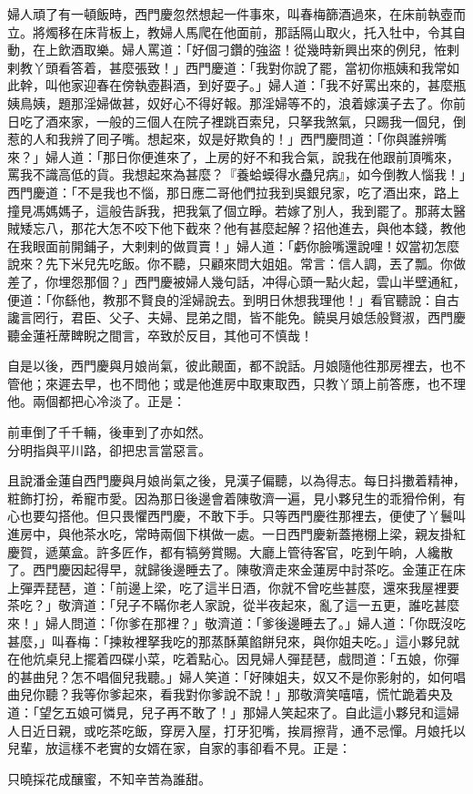 婦人頑了有一頓飯時，西門慶忽然想起一件事來，叫春梅篩酒過來，在床前執壺而立。將燭移在床背板上，教婦人馬爬在他面前，那話隔山取火，托入牡中，令其自動，在上飲酒取樂。婦人罵道：「好個刁鑽的強盜！從幾時新興出來的例兒，恠剌剌教丫頭看答着，甚麼張致！」西門慶道：「我對你說了罷，當初你瓶姨和我常如此幹，叫他家迎春在傍執壺斟酒，到好耍子。」婦人道：「我不好罵出來的，甚麼瓶姨鳥姨，題那淫婦做甚，奴好心不得好報。那淫婦等不的，浪着嫁漢子去了。你前日吃了酒來家，一般的三個人在院子裡跳百索兒，只拏我煞氣，只踢我一個兒，倒惹的人和我辨了囘子嘴。想起來，奴是好欺負的！」西門慶問道：「你與誰辨嘴來？」婦人道：「那日你便進來了，上房的好不和我合氣，說我在他跟前頂嘴來，罵我不識高低的貨。我想起來為甚麼？『養蛤蟆得水蠱兒病』，如今倒教人惱我！」西門慶道：「不是我也不惱，那日應二哥他們拉我到吳銀兒家，吃了酒出來，路上撞見馮媽媽子，這般告訴我，把我氣了個立睜。若嫁了別人，我到罷了。那蔣太醫賊矮忘八，那花大怎不咬下他下截來？{}他有甚麼起解？招他進去，與他本錢，教他在我眼面前開鋪子，大剌剌的做買賣！」婦人道：「虧你臉嘴還說哩！{}奴當初怎麼說來？先下米兒先吃飯。你不聽，只顧來問大姐姐。常言：信人調，丟了瓢。你做差了，你埋怨那個？」西門慶被婦人幾句話，冲得心頭一點火起，雲山半壁通紅，便道：「你繇他，教那不賢良的淫婦說去。到明日休想我理他！」看官聽說：自古讒言罔行，君臣、父子、夫婦、昆弟之間，皆不能免。饒吳月娘恁般賢淑，西門慶聽金蓮衽蓆睥睨之間言，卒致於反目，其他可不慎哉！

自是以後，西門慶與月娘尚氣，彼此覿面，都不說話。月娘隨他徃那房裡去，也不管他；來遲去早，也不問他；或是他進房中取東取西，只教丫頭上前答應，也不理他。兩個都把心冷淡了。正是：

\begin{myquote}
前車倒了千千輛，後車到了亦如然。\\分明指與平川路，卻把忠言當惡言。
\end{myquote}

且說潘金蓮自西門慶與月娘尚氣之後，見漢子偏聽，以為得志。每日抖擻着精神，粧飾打扮，希寵市愛。因為那日後邊會着陳敬濟一遍，見小夥兒生的乖猾伶俐，有心也要勾搭他。但只畏懼西門慶，不敢下手。只等西門慶徃那裡去，便使了丫鬟叫進房中，與他茶水吃，常時兩個下棋做一處。一日西門慶新蓋捲棚上梁，親友掛紅慶賀，遞菓盒。許多匠作，都有犒勞賞賜。大廳上管待客官，吃到午晌，人纔散了。西門慶因起得早，就歸後邊睡去了。陳敬濟走來金蓮房中討茶吃。金蓮正在床上彈弄琵琶，道：「前邊上梁，吃了這半日酒，你就不曾吃些甚麼，還來我屋裡要茶吃？」敬濟道：「兒子不瞞你老人家說，從半夜起來，亂了這一五更，誰吃甚麼來！」婦人問道：「你爹在那裡？」{}敬濟道：「爹後邊睡去了。」婦人道：「你既沒吃甚麼，」叫春梅：「揀籹裡拏我吃的那蒸酥菓餡餅兒來，與你姐夫吃。」這小夥兒就在他炕桌兒上擺着四碟小菜，吃着點心。因見婦人彈琵琶，戲問道：「五娘，你彈的甚曲兒？怎不唱個兒我聽。」婦人笑道：「好陳姐夫，奴又不是你影射的，{}如何唱曲兒你聽？我等你爹起來，看我對你爹說不說！」那敬濟笑嘻嘻，慌忙跪着央及道：「望乞五娘可憐見，兒子再不敢了！」{}那婦人笑起來了。自此這小夥兒和這婦人日近日親，或吃茶吃飯，穿房入屋，打牙犯嘴，挨肩擦背，通不忌憚。月娘托以兒輩，放這樣不老實的女婿在家，自家的事卻看不見。正是：

\begin{myquote}
只曉採花成釀蜜，不知辛苦為誰甜。
\end{myquote}

